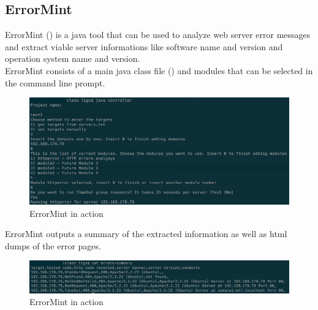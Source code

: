 \subsection{ErrorMint}
ErrorMint () is a java tool that can be used to analyze web server error messages and extract viable server informations like software name and version and operation system name and version.\\
ErrorMint consists of a main java class file () and modules that can be selected in the command line prompt.
\begin{figure}[ht]
	\centering
	\includegraphics[width=.8\linewidth]{figures/OTG-ERR-001-1.png}
	\caption{ErrorMint in action}
	\label{fig:tool_sid_analysis}
\end{figure}
ErrorMint outputs a summary of the extracted information as well as html dumps of the error pages.
\begin{figure}[ht]
	\centering
	\includegraphics[width=.8\linewidth]{figures/OTG-ERR-001-2.png}
	\caption{ErrorMint in action}
	\label{fig:tool_error_mint}
\end{figure}
